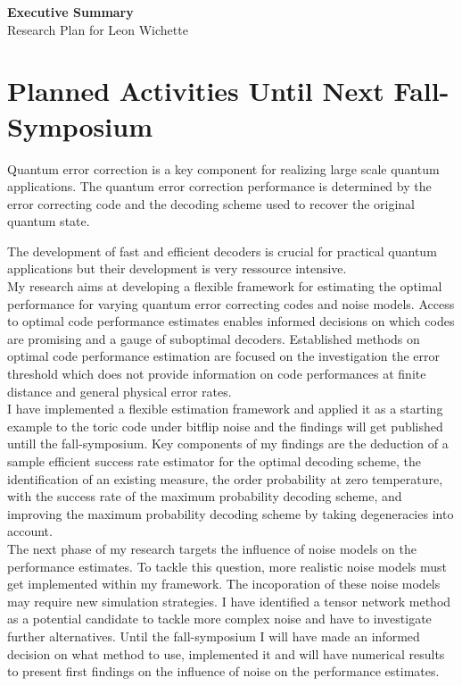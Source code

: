 \documentclass[11pt,a4paper]{article}
\begin{document}
\begin{center}
    \LARGE \textbf{Executive Summary} \\
    \large Research Plan for Leon Wichette\\
    \normalsize\vspace{0.5cm}
\end{center}

\section*{Planned Activities Until Next Fall-Symposium}
Quantum error correction is a key component for realizing large scale quantum applications.
The quantum error correction performance is determined by the error correcting code and the decoding scheme used to recover the original quantum state.

The development of fast and efficient decoders is crucial for practical quantum applications but their development is very ressource intensive.\\
My research aims at developing a flexible framework for estimating the optimal performance for varying quantum error correcting codes and noise models.
Access to optimal code performance estimates enables informed decisions on which codes are promising and a gauge of suboptimal decoders.
Established methods on optimal code performance estimation are focused on the investigation the error threshold which does not provide information on code performances at finite distance and general physical error rates.\\
I have implemented a flexible estimation framework and applied it as a starting example to the toric code under bitflip noise and the findings will get published untill the fall-symposium.
Key components of my findings are the deduction of a sample efficient success rate estimator for the optimal decoding scheme, the identification of an existing measure, the order probability at zero temperature, with the success rate of the maximum probability decoding scheme, and improving the maximum probability decoding scheme by taking degeneracies into account.\\
The next phase of my research targets the influence of noise models on the performance estimates. To tackle this question, more realistic noise models must get implemented within my framework.
The incoporation of these noise models may require new simulation strategies. I have identified a tensor network method as a potential candidate to tackle more complex noise and have to investigate further alternatives.
Until the fall-symposium I will have made an informed decision on what method to use, implemented it and will have numerical results to present first findings on the influence of noise on the performance estimates.
\end{document}

